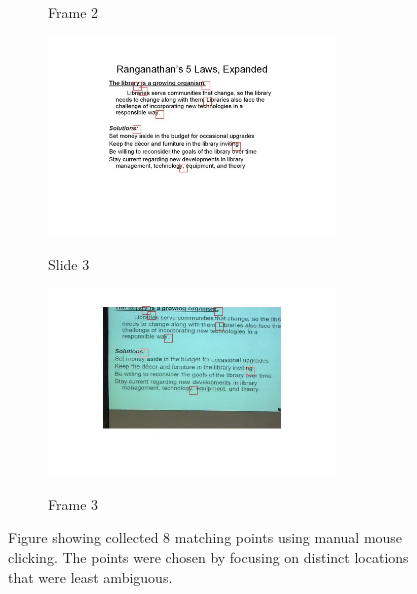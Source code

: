 \begin{figure}[ht]
\begin{subfigure}{0.5\textwidth}
		\caption{Frame 2}
	\end{subfigure}
	\begin{subfigure}{0.5\textwidth}
	    {\includegraphics[width=3in]{figs/vizSlidePts_3.jpg}}
		\caption{Slide 3}
	\end{subfigure}
	\begin{subfigure}{0.5\textwidth}
	    {\includegraphics[width=3in]{figs/vizFramePts_3.jpg}}
	    \caption{Frame 3}
	\end{subfigure}
	\caption{Figure showing collected 8 matching points using manual mouse clicking. The points were chosen by focusing on distinct locations that were least ambiguous.}
	\label{fig:slideframe}
\end{figure}

